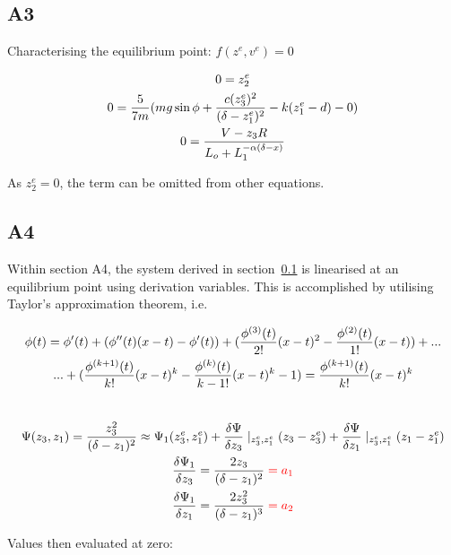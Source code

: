 \documentclass[a4paper,10pt,reqno]{amsart}
\numberwithin{equation}{section}
\begin{document}
\subsection{A3}\label{sec:A3} 

\par Characterising the equilibrium point: $f(z^e,v^e)=0$

\begin{gather}
    0=z_2^e
    \notag\\
    0=\frac{5}{7m}(mg\sin{\phi}+\frac{c(z_3^e)^2}{(\delta-z_1^e)^2}-k(z_1^e-d)-0)
    \notag\\
    0=\frac{V-z_3R}{L_o+L_1^{-\alpha(\delta-x)}}
\end{gather}

\par As $z_2^e=0$, the term can be omitted from other equations.

\subsection{A4}\label{sec:A4}

\par Within section A4, the system derived in section~\ref{sec:A3} is linearised at an equilibrium point using derivation variables. This is accomplished by utilising Taylor's approximation theorem, i.e.

\begin{gather}
    \phi(t)=\phi'(t)+(\phi''(t)(x-t)-\phi'(t))+(\frac{\phi^{(3)}(t)}{2!}(x-t)^2-\frac{\phi^{(2)}(t)}{1!}(x-t))+...
    \notag\\
    ...+(\frac{\phi^{(k+1)}(t)}{k!}(x-t)^k - \frac{\phi^{(k)}(t)}{k-1!}(x-t)^k-1) = \frac{\phi^{(k+1)}(t)}{k!}(x-t)^k
\end{gather}
\\
\begin{gather}
    \Psi(z_3,z_1)=\frac{z_3^2}{(\delta-z_1)^2}\approx\Psi_1(z_3^e,z_1^e)+\frac{\delta\Psi}{\delta z_3}\mid_{z_3^e,z_1^e}(z_3-z_3^e)+\frac{\delta\Psi}{\delta z_1}\mid_{z_3^e,z_1^e}(z_1-z_1^e)
    \notag\\
    \frac{\delta\Psi_1}{\delta z_3}=\frac{2z_3}{(\delta-z_1)^2}\color{red}=a_1\color{black}
    \notag\\
    \frac{\delta\Psi_1}{\delta z_1}=\frac{2z_3^2}{(\delta-z_1)^3}\color{red}=a_2\color{black}
\end{gather}

Values then evaluated at zero:
\end{document}
